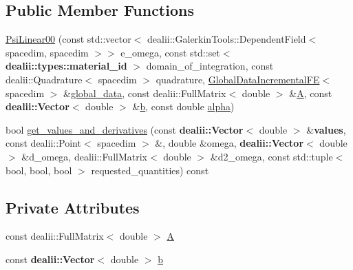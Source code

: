 \subsection*{Public Member Functions}
\begin{DoxyCompactItemize}
\item 
\hyperlink{classincremental_f_e_1_1_psi_linear00_aa5dbe1b55411bfc642c4c9ed2508eefe}{Psi\+Linear00} (const std\+::vector$<$ dealii\+::\+Galerkin\+Tools\+::\+Dependent\+Field$<$ spacedim, spacedim $>$$>$ e\+\_\+omega, const std\+::set$<$ {\bf dealii\+::types\+::material\+\_\+id} $>$ domain\+\_\+of\+\_\+integration, const dealii\+::\+Quadrature$<$ spacedim $>$ quadrature, \hyperlink{classincremental_f_e_1_1_global_data_incremental_f_e}{Global\+Data\+Incremental\+FE}$<$ spacedim $>$ \&\hyperlink{classincremental_f_e_1_1_psi_3_01spacedim_00_01spacedim_01_4_abf0a4804877fd7cc9bd1b90e52760ba9}{global\+\_\+data}, const dealii\+::\+Full\+Matrix$<$ double $>$ \&\hyperlink{classincremental_f_e_1_1_psi_linear00_a6d4534350ad8b74c6930c3afa1031801}{A}, const {\bf dealii\+::\+Vector}$<$ double $>$ \&\hyperlink{classincremental_f_e_1_1_psi_linear00_ab16d4f5295fc2637f0f7662843d4cac1}{b}, const double \hyperlink{classincremental_f_e_1_1_psi_3_01spacedim_00_01spacedim_01_4_af7b8227188dbdd6ada35b9445d96c79d}{alpha})
\item 
bool \hyperlink{classincremental_f_e_1_1_psi_linear00_ac2fdec793550c0f26808e02d9d17b889}{get\+\_\+values\+\_\+and\+\_\+derivatives} (const {\bf dealii\+::\+Vector}$<$ double $>$ \&{\bf values}, const dealii\+::\+Point$<$ spacedim $>$ \&, double \&omega, {\bf dealii\+::\+Vector}$<$ double $>$ \&d\+\_\+omega, dealii\+::\+Full\+Matrix$<$ double $>$ \&d2\+\_\+omega, const std\+::tuple$<$ bool, bool, bool $>$ requested\+\_\+quantities) const 
\end{DoxyCompactItemize}
\subsection*{Private Attributes}
\begin{DoxyCompactItemize}
\item 
const dealii\+::\+Full\+Matrix$<$ double $>$ \hyperlink{classincremental_f_e_1_1_psi_linear00_a6d4534350ad8b74c6930c3afa1031801}{A}
\item 
const {\bf dealii\+::\+Vector}$<$ double $>$ \hyperlink{classincremental_f_e_1_1_psi_linear00_ab16d4f5295fc2637f0f7662843d4cac1}{b}
\end{DoxyCompactItemize}


